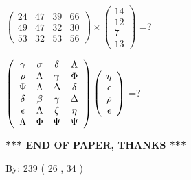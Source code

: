 \documentclass[12pt]{article}
\begin{document}
  
 
$ \left( \begin{array}{ccccccccc}
          24  & 
          47  & 
          39  & 
          66  \\ 
          49  & 
          47  & 
          32  & 
          30  \\ 
          53  & 
          32  & 
          53  & 
          56
\end{array}\right) \times
\left( \begin{array}{c}
          14  \\ 
          12  \\ 
           7  \\ 
          13
\end{array}\right) $ =?
 
 
$  %
 \left( \begin{array}
 {
 c
 c
 c
 c
 }
 \gamma & 
 \sigma & 
 \delta & 
 \Lambda \\ 
 \rho & 
 \Lambda & 
 \gamma & 
 \Phi \\ 
 \Psi & 
 \Lambda & 
 \Delta & 
 \delta \\ 
 \delta & 
 \beta & 
 \gamma & 
 \Delta \\ 
 \epsilon & 
 \Lambda & 
                    \zeta & 
 \eta \\ 
 \Lambda & 
 \Phi & 
 \Psi & 
 \Psi
 \end{array} \right)
 \left( \begin{array}
 {
 c
 }
 \eta \\ 
 \epsilon \\ 
 \rho \\ 
 \epsilon
 \end{array} \right)
$ =?
 

 

 
\vspace{0.3in}
   
   
 \vspace{0.2in}
 
   
   
   
   
\vspace{1.0in} 
{\textbf{\large{ *** END OF PAPER, THANKS *** }}} 
   
   
\hspace{1.0in} By: 
         239 (          26 ,           34 )
   
   
   
   
\newpage 
\setcounter{page}{ 
    31001 } 
   
\end{document}
